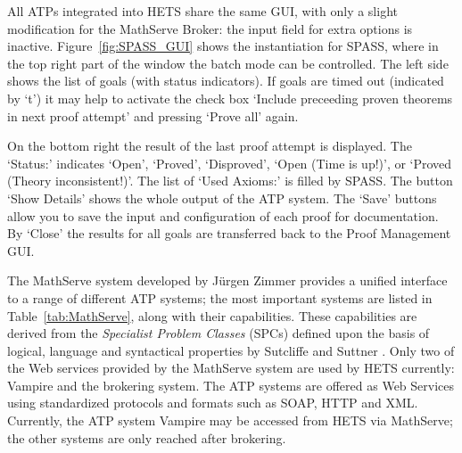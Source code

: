 \documentclass{article}
\newcommand{\normalTEXTSC}[2]{{#1\scriptsize#2}}
\newcommand     {\Hets}{\normalTEXTSC{H}{ETS}\xspace}
\newcommand     {\SPASS}{\normalTEXTSC{S}{PASS}\xspace}
\begin{document}
All ATPs integrated into \Hets share the same GUI, with only a slight
modification for the MathServe Broker: the input field for extra options is
inactive. Figure~\ref{fig:SPASS_GUI} shows the instantiation for \SPASS, where
in the top right part of the window the batch mode can be controlled.  The
left side shows the list of goals (with status indicators).  If goals are
timed out (indicated by `t') it may help to activate the check box `Include
preceeding proven theorems in next proof attempt' and pressing `Prove all'
again.

On the bottom right the result of the last proof
attempt is displayed.  The `Status:' indicates `Open', `Proved', `Disproved',
`Open (Time is up!)', or `Proved (Theory inconsistent!)'. The list of `Used
Axioms:' is filled by \SPASS. The button `Show Details' shows the whole output
of the ATP system. The `Save' buttons allow you to save the input and
configuration of each proof for documentation. By `Close' the results for all
goals are transferred back to the Proof Management GUI.

The MathServe system \cite{ZimmerAutexier06} developed by J\"{u}rgen
Zimmer provides a unified interface to a range of different ATP
systems; the most important systems are listed in
Table~\ref{tab:MathServe}, along with their capabilities. These
capabilities are derived from the \emph{Specialist Problem Classes}
(SPCs) defined upon the basis of logical, language and syntactical
properties by Sutcliffe and Suttner \cite{SutcliffeEA:2001:EvalATP}.
Only two of the Web services provided by the MathServe system are used
by \Hets currently: Vampire and the brokering system.  The ATP systems
are offered as Web Services using standardized protocols and formats
such as SOAP, HTTP and XML.  Currently, the ATP system Vampire may be
accessed from \Hets via MathServe; the other systems are only reached
after brokering.
\end{document}
